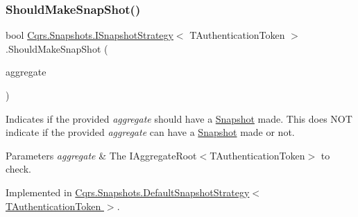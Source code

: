 \mbox{\label{interfaceCqrs_1_1Snapshots_1_1ISnapshotStrategy_ab1d54cd76c7ac832329cb3a6de0effcd_ab1d54cd76c7ac832329cb3a6de0effcd}} 
\subsubsection{\texorpdfstring{Should\+Make\+Snap\+Shot()}{ShouldMakeSnapShot()}}
{\footnotesize\ttfamily bool \hyperlink{interfaceCqrs_1_1Snapshots_1_1ISnapshotStrategy}{Cqrs.\+Snapshots.\+I\+Snapshot\+Strategy}$<$ T\+Authentication\+Token $>$.Should\+Make\+Snap\+Shot (\begin{DoxyParamCaption}\item[{\hyperlink{interfaceCqrs_1_1Domain_1_1IAggregateRoot}{I\+Aggregate\+Root}$<$ T\+Authentication\+Token $>$}]{aggregate }\end{DoxyParamCaption})}



Indicates if the provided {\itshape aggregate}  should have a \hyperlink{classCqrs_1_1Snapshots_1_1Snapshot}{Snapshot} made. This does N\+OT indicate if the provided {\itshape aggregate}  can have a \hyperlink{classCqrs_1_1Snapshots_1_1Snapshot}{Snapshot} made or not. 


\begin{DoxyParams}{Parameters}
{\em aggregate} & The I\+Aggregate\+Root$<$\+T\+Authentication\+Token$>$ to check.\\
\hline
\end{DoxyParams}


Implemented in \hyperlink{classCqrs_1_1Snapshots_1_1DefaultSnapshotStrategy_a211413236ef217c73a69e8d7fe4e555e_a211413236ef217c73a69e8d7fe4e555e}{Cqrs.\+Snapshots.\+Default\+Snapshot\+Strategy$<$ T\+Authentication\+Token $>$}.

